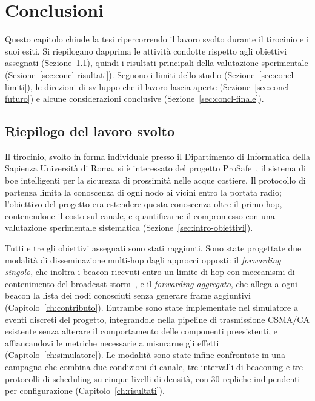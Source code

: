 \chapter{Conclusioni}
\label{ch:conclusioni}

Questo capitolo chiude la tesi ripercorrendo il lavoro svolto durante il
tirocinio e i suoi esiti. Si riepilogano dapprima le attivit\`a condotte
rispetto agli obiettivi assegnati (Sezione~\ref{sec:concl-riepilogo}), quindi
i risultati principali della valutazione sperimentale
(Sezione~\ref{sec:concl-risultati}). Seguono i limiti dello studio
(Sezione~\ref{sec:concl-limiti}), le direzioni di sviluppo che il lavoro
lascia aperte (Sezione~\ref{sec:concl-futuro}) e alcune considerazioni
conclusive (Sezione~\ref{sec:concl-finale}).

\section{Riepilogo del lavoro svolto}
\label{sec:concl-riepilogo}
Il tirocinio, svolto in forma individuale presso il Dipartimento di
Informatica della Sapienza Universit\`a di Roma, si \`e interessato del
progetto ProSafe~\cite{prosafe}, il sistema di boe intelligenti per la
sicurezza di prossimit\`a nelle acque costiere. Il protocollo di partenza limita
la conoscenza di ogni nodo ai vicini entro la portata radio; l'obiettivo del
progetto era estendere questa conoscenza oltre il primo hop, contenendone il
costo sul canale, e quantificarne il compromesso con una valutazione
sperimentale sistematica (Sezione~\ref{sec:intro-obiettivi}).

Tutti e tre gli obiettivi assegnati sono stati raggiunti. Sono state
progettate due modalit\`a di disseminazione multi-hop dagli approcci opposti:
il \emph{forwarding singolo}, che inoltra i beacon ricevuti entro un limite
di hop con meccanismi di contenimento del broadcast storm~\cite{broadcaststorm}, e il
\emph{forwarding aggregato}, che allega a ogni beacon la lista dei nodi
conosciuti senza generare frame aggiuntivi (Capitolo~\ref{ch:contributo}). Entrambe
sono state implementate nel simulatore a eventi discreti del progetto,
integrandole nella pipeline di trasmissione CSMA/CA esistente senza alterare
il comportamento delle componenti preesistenti, e affiancandovi le metriche
necessarie a misurarne gli effetti (Capitolo~\ref{ch:simulatore}). Le
modalit\`a sono state infine confrontate in una campagna che combina due
condizioni di canale, tre intervalli di beaconing e tre protocolli di
scheduling su cinque livelli di densit\`a, con 30 repliche indipendenti per
configurazione (Capitolo~\ref{ch:risultati}).

